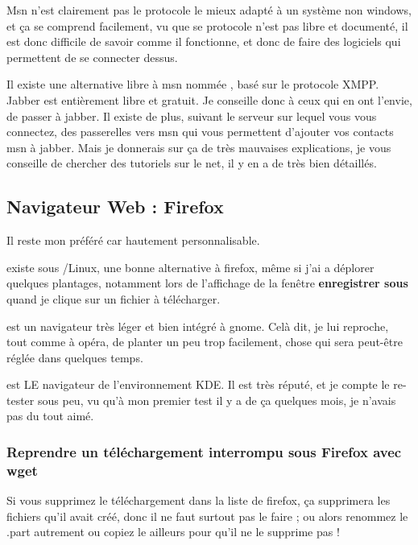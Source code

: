 \documentclass[a4paper,twoside]{article}
\begin{document}
\bigskip

Msn n'est clairement pas le protocole le mieux adapté à un système non windows, et ça se comprend facilement, vu que se protocole n'est pas libre et documenté, il est donc difficile de savoir comme il fonctionne, et donc de faire des logiciels qui permettent de se connecter dessus.

Il existe une alternative libre à msn nommée , basé sur le protocole XMPP. Jabber est entièrement libre et gratuit. Je conseille donc à ceux qui en ont l'envie, de passer à jabber. Il existe de plus, suivant le serveur sur lequel vous vous connectez, des passerelles vers msn qui vous permettent d'ajouter vos contacts msn à jabber. Mais je donnerais sur ça de très mauvaises explications, je vous conseille de chercher des tutoriels sur le net, il y en a de très bien détaillés.

\subsection{Navigateur Web : Firefox}
 Il reste mon préféré car hautement personnalisable.

 existe sous /Linux, une bonne alternative à firefox, même si j'ai a déplorer quelques plantages, notamment lors de l'affichage de la fenêtre \textbf{enregistrer sous} quand je clique sur un fichier à télécharger.

 est un navigateur très léger et bien intégré à gnome. Celà dit, je lui reproche, tout comme à opéra, de planter un peu trop facilement, chose qui sera peut-être réglée dans quelques temps.

 est LE navigateur de l'environnement KDE. Il est très réputé, et je compte le re-tester sous peu, vu qu'à mon premier test il y a de ça quelques mois, je n'avais pas du tout aimé.

\subsubsection{Reprendre un téléchargement interrompu sous Firefox avec wget}

\begin{attention}
Si vous supprimez le téléchargement dans la liste de firefox, ça supprimera les fichiers qu'il avait créé, donc il ne faut surtout pas le faire ; ou alors renommez le .part autrement ou copiez le ailleurs pour qu'il ne le supprime pas !
\end{attention}
\end{document}
